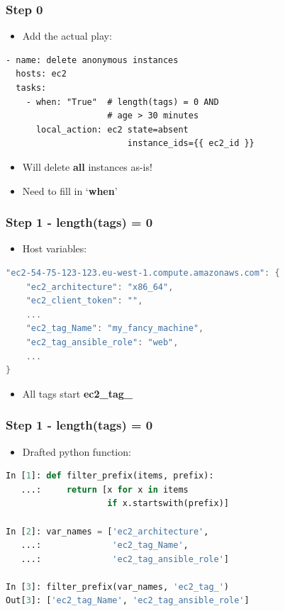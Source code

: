 \documentclass{beamer}
\begin{document}
\begin{frame}[fragile]\frametitle{Step 0}

    \begin{itemize}
        \item Add the actual play:
    \end{itemize}

    \begin{lstlisting}
- name: delete anonymous instances
  hosts: ec2
  tasks:
    - when: "True"  # length(tags) = 0 AND
                    # age > 30 minutes
      local_action: ec2 state=absent
                        instance_ids={{ ec2_id }}
    \end{lstlisting}

    \begin{itemize}
        \item Will delete \textbf{all} instances as-is!
        \item Need to fill in `\textbf{when}'
    \end{itemize}

\end{frame}


\begin{frame}[fragile]\frametitle{Step 1 - length(tags) = 0}

    \begin{itemize}
        \item Host variables:
    \end{itemize}

    \begin{lstlisting}[language=C]
"ec2-54-75-123-123.eu-west-1.compute.amazonaws.com": {
    "ec2_architecture": "x86_64",
    "ec2_client_token": "",
    ...
    "ec2_tag_Name": "my_fancy_machine",
    "ec2_tag_ansible_role": "web",
    ...
}
    \end{lstlisting}

    \begin{itemize}
        \item All tags start \textbf{ec2\_tag\_}
    \end{itemize}

\end{frame}


\begin{frame}[fragile]\frametitle{Step 1 - length(tags) = 0}

    \begin{itemize}
        \item Drafted python function:
    \end{itemize}

    \begin{lstlisting}[language=Python]
In [1]: def filter_prefix(items, prefix):
   ...:     return [x for x in items
                    if x.startswith(prefix)]

In [2]: var_names = ['ec2_architecture',
   ...:              'ec2_tag_Name',
   ...:              'ec2_tag_ansible_role']

In [3]: filter_prefix(var_names, 'ec2_tag_')
Out[3]: ['ec2_tag_Name', 'ec2_tag_ansible_role']
    \end{lstlisting}

\end{frame}
\end{document}
